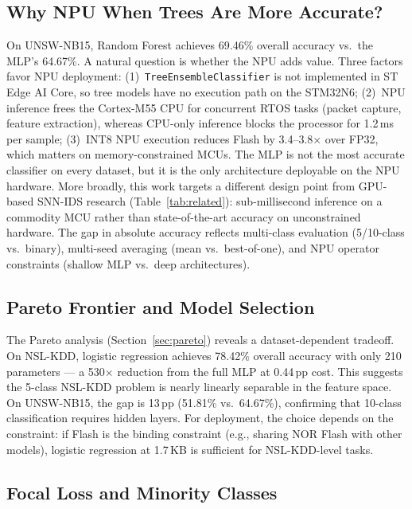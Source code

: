 \documentclass[10pt,twocolumn]{article}
\begin{document}
\subsection{Why NPU When Trees Are More Accurate?}

On UNSW-NB15, Random Forest achieves 69.46\% overall accuracy vs.\
the MLP's 64.67\%. A natural question is whether the NPU adds value.
Three factors favor NPU deployment:
(1)~\texttt{TreeEnsembleClassifier} is not implemented in ST Edge AI
Core, so tree models have no execution path on the STM32N6;
(2)~NPU inference frees the Cortex-M55 CPU for concurrent RTOS tasks
(packet capture, feature extraction), whereas CPU-only inference
blocks the processor for 1.2\,ms per sample;
(3)~INT8 NPU execution reduces Flash by 3.4--3.8$\times$ over FP32,
which matters on memory-constrained MCUs.
The MLP is not the most accurate classifier on every dataset, but it is
the only architecture deployable on the NPU hardware.
More broadly, this work targets a different design point from
GPU-based SNN-IDS research (Table~\ref{tab:related}):
sub-millisecond inference on a commodity MCU rather than state-of-the-art
accuracy on unconstrained hardware. The gap in absolute accuracy
reflects multi-class evaluation (5/10-class vs.\ binary),
multi-seed averaging (mean vs.\ best-of-one), and NPU operator
constraints (shallow MLP vs.\ deep architectures).

\subsection{Pareto Frontier and Model Selection}

The Pareto analysis (Section~\ref{sec:pareto}) reveals a dataset-dependent
tradeoff. On NSL-KDD, logistic regression achieves 78.42\% overall
accuracy with only 210 parameters --- a 530$\times$ reduction from
the full MLP at 0.44\,pp cost. This suggests the 5-class NSL-KDD
problem is nearly linearly separable in the feature space.
On UNSW-NB15, the gap is 13\,pp (51.81\% vs.\ 64.67\%), confirming
that 10-class classification requires hidden layers.
For deployment, the choice depends on the constraint: if Flash is
the binding constraint (e.g., sharing NOR Flash with other models),
logistic regression at 1.7\,KB is sufficient for NSL-KDD-level tasks.

\subsection{Focal Loss and Minority Classes}
\end{document}

